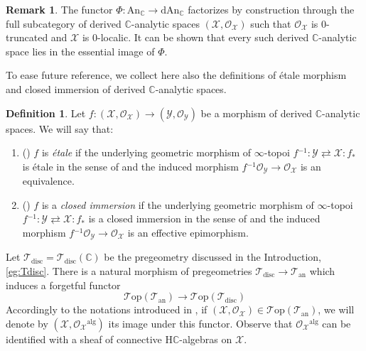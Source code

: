 \documentclass[12pt,a4paper,reqno]{amsart}
\theoremstyle{plain}
\theoremstyle{definition}
\newtheorem{defin}[thm]{Definition}
\newtheorem{rem}[thm]{Remark}
\theoremstyle{remark}
\numberwithin{equation}{section}
\begin{document}
\begin{rem}
	The functor $\Phi \colon {\mathrm{An}_{{\mathbb C}}} \to {\mathrm{dAn}_{\mathbb C}}$ factorizes by construction through the full subcategory of derived {$\mathbb C$-analytic\xspace} spaces $({\mathcal X}, {\mathcal O}_{\mathcal X})$ such that ${\mathcal O}_{\mathcal X}$ is $0$-truncated and ${\mathcal X}$ is $0$-localic. It can be shown that every such derived {$\mathbb C$-analytic\xspace} space lies in the essential image of $\Phi$.
\end{rem}

To ease future reference, we collect here also the definitions of \'etale morphism and closed immersion of derived {$\mathbb C$-analytic\xspace} spaces.

\begin{defin}\label{def:etale_and_closed_morphisms}
	Let $f \colon ({\mathcal X}, {\mathcal O}_{\mathcal X}) \to ({\mathcal Y}, {\mathcal O}_{\mathcal Y})$ be a morphism of derived {$\mathbb C$-analytic\xspace} spaces.
	We will say that:
	\begin{enumerate}
		\item (\cite[Definition 2.3.1]{DAG-V}) $f$ is \emph{\'etale} if the underlying geometric morphism of $\infty$-topoi $f{^{-1}} \colon {\mathcal Y} \rightleftarrows {\mathcal X} \colon f_*$ is \'etale in the sense of \cite[Â§ 6.3.5]{HTT} and the induced morphism $f{^{-1}} {\mathcal O}_{\mathcal Y} \to {\mathcal O}_{\mathcal X}$ is an equivalence.
		\item (\cite[Definition 1.1]{DAG-IX}) $f$ is a \emph{closed immersion} if the underlying geometric morphism of $\infty$-topoi $f{^{-1}} \colon {\mathcal Y} \rightleftarrows {\mathcal X} \colon f_*$ is a closed immersion in the sense of \cite[7.3.2.7]{HTT} and the induced morphism $f{^{-1}} {\mathcal O}_{\mathcal Y} \to {\mathcal O}_{\mathcal X}$ is an effective epimorphism.
	\end{enumerate}
\end{defin}

Let ${{\mathcal T}_{\mathrm{disc}}} = {{\mathcal T}_{\mathrm{disc}}}(\mathbb C)$ be the pregeometry discussed in the Introduction, \cref{eg:Tdisc}.
There is a natural morphism of pregeometries ${{\mathcal T}_{\mathrm{disc}}} \to {{\mathcal T}_{\mathrm{an}}}$ which induces a forgetful functor
\[ {\mathcal T\mathrm{op}}({{\mathcal T}_{\mathrm{an}}}) \to {\mathcal T\mathrm{op}}({{\mathcal T}_{\mathrm{disc}}}) \]
Accordingly to the notations introduced in \cite{DAG-IX}, if $({\mathcal X}, {\mathcal O}_{\mathcal X}) \in {\mathcal T\mathrm{op}}({{\mathcal T}_{\mathrm{an}}})$, we will denote by $({\mathcal X}, {\mathcal O}_{\mathcal X}{^\mathrm{alg}})$ its image under this functor.
Observe that ${\mathcal O}_{\mathcal X}{^\mathrm{alg}}$ can be identified with a sheaf of connective ${\mathrm H} \mathbb C$-algebras on ${\mathcal X}$.
\end{document}
